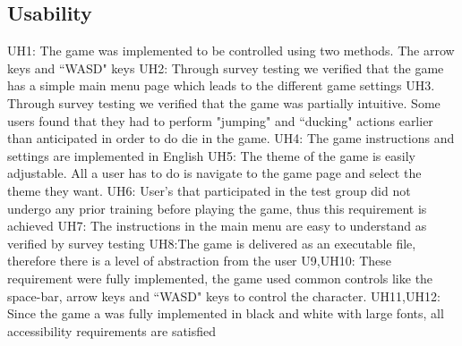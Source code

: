 \documentclass[12pt, titlepage]{article}
\begin{document}
\subsection{Usability}
UH1: The game was implemented to be controlled using two methods. The arrow keys and ``WASD" keys
UH2: Through survey testing we verified that the game has a simple main menu page which leads to the different game settings	UH3. Through survey testing we verified that the game was partially intuitive. Some users found that they had to perform "jumping" and ``ducking" actions earlier than anticipated in order to do die in the game.
UH4: The game instructions and settings are implemented in English
UH5: The theme of the game is easily adjustable. All a user has to do is navigate to the game page and select the theme they want.
UH6: User's that participated in the test group did not undergo any prior training before playing the game, thus this requirement is achieved
UH7: The instructions in the main menu are easy to understand as verified by survey testing
UH8:The game is delivered as an executable file, therefore there is a level of abstraction from the user
U9,UH10: These requirement were fully implemented, the game used common controls like the space-bar, arrow keys and ``WASD" keys to control the character.
UH11,UH12: Since the game a was fully implemented in black and white with large fonts, all accessibility requirements are satisfied
\end{document}
